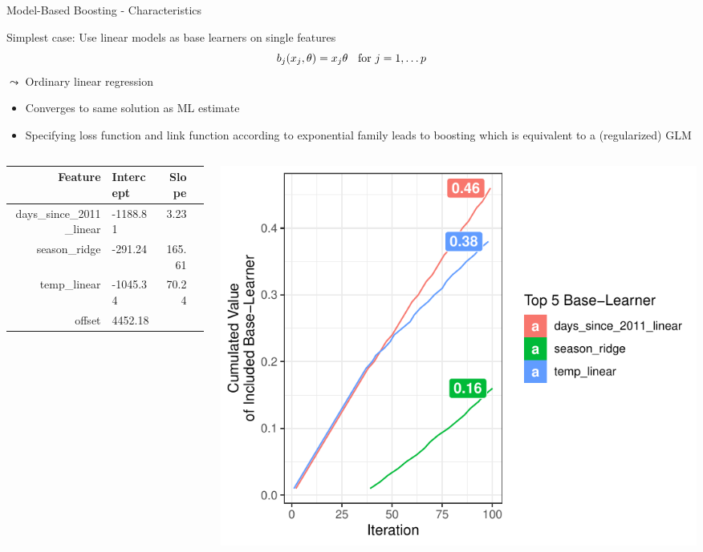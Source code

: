 \documentclass[11pt,compress,t,notes=noshow, aspectratio=169, xcolor=table]{beamer}
\begin{document}
\begin{frame}{Model-Based Boosting - Characteristics}

Simplest case: Use linear models as base learners on single features
$$
b_j(x_j, \theta) = x_j\theta \hspace*{0.2cm}\text{ for } j = 1,\ldots p
$$
$\leadsto$ Ordinary linear regression
\begin{itemize}
\item Converges to same solution as ML estimate
\item Specifying loss function and link function according to exponential family leads to boosting which is equivalent to a (regularized) GLM

\end{itemize}

\begin{columns}[T]
\begin{column}{0.4\textwidth}
\footnotesize
  \begin{table}[ht]
\centering
\begin{tabular}{rlrr}
  \hline
 Feature & Intercept & Slope \\ 
  \hline
days\_since\_2011\_linear & -1188.81 & 3.23 \\ 
 season\_ridge & -291.24 & 165.61 \\ 
 temp\_linear & -1045.34 & 70.24 \\ 
 offset & 4452.18 &  \\ 
   \hline
\end{tabular}
\end{table}
\end{column}
\begin{column}{0.6\textwidth}
  \includegraphics[width =0.9 \textwidth]{figure/compboost_base_linear.pdf} 
\end{column}
\end{columns}
\end{frame}
\end{document}
